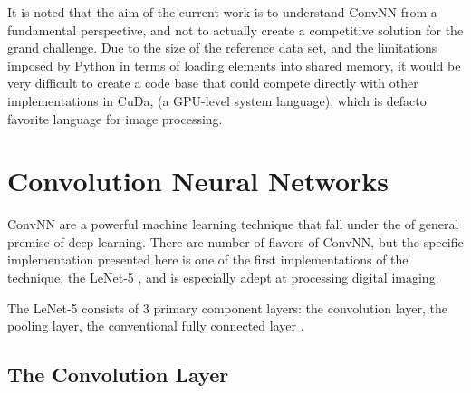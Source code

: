 \documentclass[letterpaper,12pt]{article}
\begin{document}
It is noted that the aim of the current work is to understand ConvNN from a fundamental perspective, and not to actually create a competitive solution for the grand challenge. Due to the size of the reference data set, and the limitations imposed by Python in terms of loading elements into shared memory, it would be very difficult to create a code base that could compete directly with other implementations in CuDa, (a GPU-level system language), which is defacto favorite language for image processing.	

\section{Convolution Neural Networks}

ConvNN are a powerful machine learning technique that fall under the of general premise of deep learning. There are number of flavors of ConvNN, but the specific implementation presented here is one of the first implementations of the technique, the LeNet-5 \cite{LeNet}, and is especially adept at processing digital imaging.

The LeNet-5 consists of 3 primary component layers: the convolution layer, the pooling layer, the conventional fully connected layer \cite{deep}. 

\subsection{The Convolution Layer}
\end{document}
